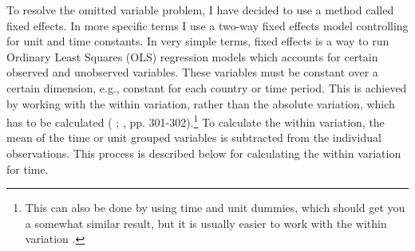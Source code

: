 To resolve the omitted variable problem, I have decided to use a method called fixed effects. In more specific terms I use a two-way fixed effects model controlling for unit and time constants. In very simple terms, fixed effects is a way to run Ordinary Least Squares (OLS) regression models which accounts for certain observed and unobserved variables. These variables must be constant over a certain dimension, e.g., constant for each country or time period. This is achieved by working with the within variation, rather than the absolute variation, which has to be calculated (\citeauthor{huntington-klein_effect_2022} \citeyear{huntington-klein_effect_2022}; \citeauthor{wooldridge_econometric_2010} \citeyear{wooldridge_econometric_2010}, pp. 301-302).\footnote{This can also be done by using time and unit dummies, which should get you a somewhat similar result, but it is usually easier to work with the within variation \citep{huntington-klein_effect_2022}.} To calculate the within variation, the mean of the time or unit grouped variables is subtracted from the individual observations. This process is described below for calculating the within variation for time. 

